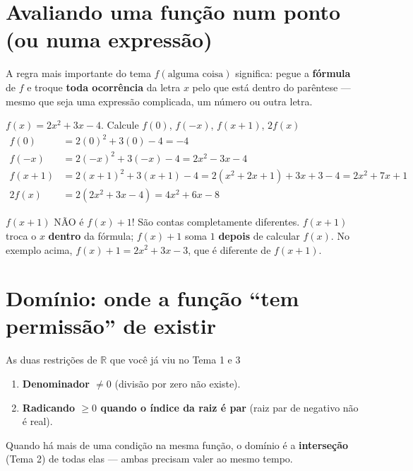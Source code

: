 \documentclass[12pt,a4paper]{article}
\begin{document}
\section{Avaliando uma função num ponto (ou numa expressão)}

\begin{dica}{A regra mais importante do tema}
$f(\text{alguma coisa})$ significa: pegue a \textbf{fórmula} de $f$ e troque
\textbf{toda ocorrência} da letra $x$ pelo que está dentro do parêntese —
mesmo que seja uma expressão complicada, um número ou outra letra.
\end{dica}

\begin{exemplo}{$f(x)=2x^2+3x-4$. Calcule $f(0)$, $f(-x)$, $f(x+1)$, $2f(x)$}
\begin{align*}
f(0) &= 2(0)^2+3(0)-4 = -4\\
f(-x) &= 2(-x)^2+3(-x)-4 = 2x^2-3x-4\\
f(x+1) &= 2(x+1)^2+3(x+1)-4 = 2(x^2+2x+1)+3x+3-4 = 2x^2+7x+1\\
2f(x) &= 2(2x^2+3x-4) = 4x^2+6x-8
\end{align*}
\end{exemplo}

\begin{atencao}{$f(x+1)$ NÃO é $f(x)+1$!}
São contas completamente diferentes. $f(x+1)$ troca o $x$ \textbf{dentro}
da fórmula; $f(x)+1$ soma $1$ \textbf{depois} de calcular $f(x)$. No
exemplo acima, $f(x)+1 = 2x^2+3x-3$, que é diferente de $f(x+1)$.
\end{atencao}

\section{Domínio: onde a função ``tem permissão'' de existir}

\begin{dica}{As duas restrições de $\mathbb{R}$ que você já viu no Tema 1 e 3}
\begin{enumerate}[nosep]
  \item \textbf{Denominador $\neq 0$} (divisão por zero não existe).
  \item \textbf{Radicando $\ge 0$ quando o índice da raiz é par} (raiz par de negativo não é real).
\end{enumerate}
Quando há mais de uma condição na mesma função, o domínio é a
\textbf{interseção} (Tema 2) de todas elas — ambas precisam valer ao mesmo tempo.
\end{dica}
\end{document}
